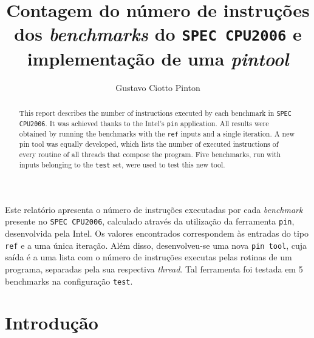 \documentclass[12pt]{article}
\title{Contagem do número de instruções dos \textit{benchmarks} do
\texttt{SPEC CPU2006} e implementação de uma \textit{pintool}}
\author{Gustavo Ciotto Pinton\inst{1} }
\begin{document}
 

\maketitle

\begin{abstract}
This report describes the number of instructions executed by each
benchmark in \texttt{SPEC CPU2006}. It was achieved thanks to the
Intel's \texttt{pin} application. All results were obtained by running the
benchmarks with the \texttt{ref} inputs and a single iteration. A new
pin tool was equally developed, which lists the number of executed instructions
of every routine of all threads that compose the program. Five benchmarks,
run with inputs belonging to the \texttt{test} set, were used to test this new
tool.
\end{abstract}
     
\begin{resumo} 
Este relatório apresenta o número de instruções executadas por cada
\textit{benchmark} presente no \texttt{SPEC CPU2006}, calculado através da
utilização da ferramenta \texttt{pin}, desenvolvida pela Intel. Os valores
encontrados correspondem às entradas do tipo \texttt{ref} e a uma única
iteração. Além disso, desenvolveu-se uma nova \texttt{pin tool}, cuja saída
é a uma lista com o número de instruções executas pelas rotinas de um programa,
separadas pela sua respectiva \textit{thread}. Tal ferramenta foi testada em 5
benchmarks na configuração \texttt{test}.
\end{resumo}


\section{Introdução}
\end{document}
